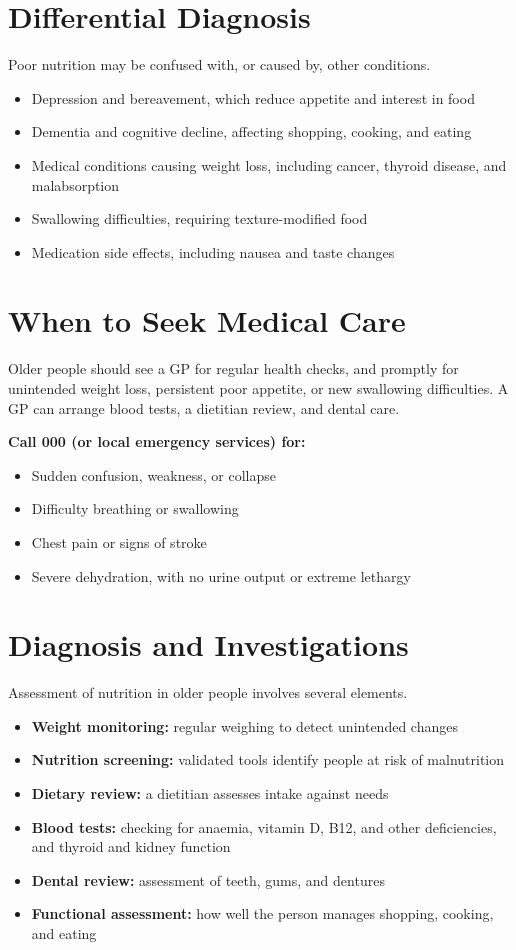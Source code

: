 \section*{Differential Diagnosis}
Poor nutrition may be confused with, or caused by, other conditions.
\begin{itemize}
    \item Depression and bereavement, which reduce appetite and interest in food
    \item Dementia and cognitive decline, affecting shopping, cooking, and eating
    \item Medical conditions causing weight loss, including cancer, thyroid disease, and malabsorption
    \item Swallowing difficulties, requiring texture-modified food
    \item Medication side effects, including nausea and taste changes
\end{itemize}

\section*{When to Seek Medical Care}
Older people should see a GP for regular health checks, and promptly for unintended weight loss, persistent poor appetite, or new swallowing difficulties. A GP can arrange blood tests, a dietitian review, and dental care.

\textbf{Call 000 (or local emergency services) for:}
\begin{itemize}
    \item Sudden confusion, weakness, or collapse
    \item Difficulty breathing or swallowing
    \item Chest pain or signs of stroke
    \item Severe dehydration, with no urine output or extreme lethargy
\end{itemize}

\section*{Diagnosis and Investigations}
Assessment of nutrition in older people involves several elements.
\begin{itemize}
    \item \textbf{Weight monitoring:} regular weighing to detect unintended changes
    \item \textbf{Nutrition screening:} validated tools identify people at risk of malnutrition
    \item \textbf{Dietary review:} a dietitian assesses intake against needs
    \item \textbf{Blood tests:} checking for anaemia, vitamin D, B12, and other deficiencies, and thyroid and kidney function
    \item \textbf{Dental review:} assessment of teeth, gums, and dentures
    \item \textbf{Functional assessment:} how well the person manages shopping, cooking, and eating
\end{itemize}

